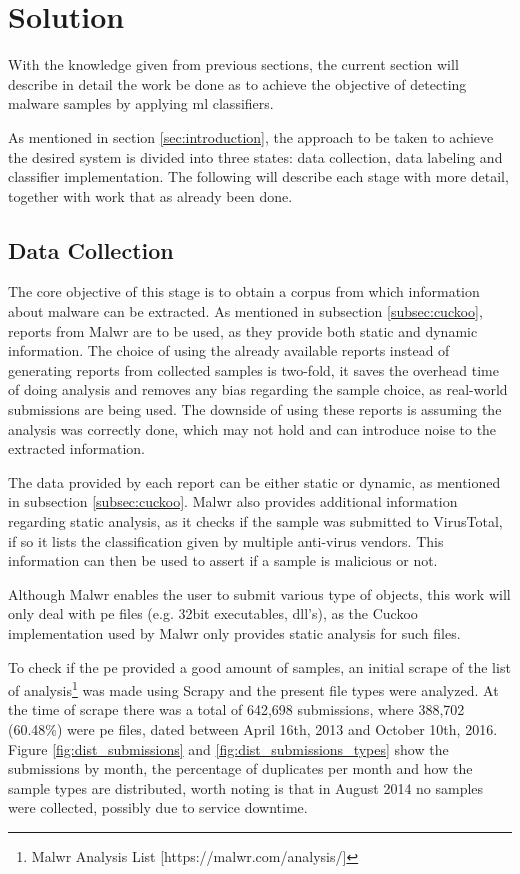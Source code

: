 \documentclass{llncs}
\begin{document}
\section{Solution}\label{sec:solution}

With the knowledge given from previous sections, the current section will describe in detail the work be done as to achieve the objective of detecting malware samples by applying \gls{ml} classifiers.

As mentioned in section \ref{sec:introduction}, the approach to be taken to achieve the desired system is divided into three states: data collection, data labeling and classifier implementation. The following will describe each stage with more detail, together with work that as already been done.

\subsection{Data Collection}\label{subsec:data_collection}

The core objective of this stage is to obtain a corpus from which information about malware can be extracted. As mentioned in subsection \ref{subsec:cuckoo}, reports from Malwr are to be used, as they provide both static and dynamic information. The choice of using the already available reports instead of generating reports from collected samples is two-fold, it saves the overhead time of doing analysis and removes any bias regarding the sample choice, as real-world submissions are being used. The downside of using these reports is assuming the analysis was correctly done, which may not hold and can introduce noise to the extracted information.

The data provided by each report can be either static or dynamic, as mentioned in subsection \ref{subsec:cuckoo}. Malwr also provides additional information regarding static analysis, as it checks if the sample was submitted to VirusTotal, if so it lists the classification given by multiple anti-virus vendors. This information can then be used to assert if a sample is malicious or not.

Although Malwr enables the user to submit various type of objects, this work will only deal with \gls{pe} files (e.g. 32bit executables, \gls{dll}'s), as the Cuckoo implementation used by Malwr only provides static analysis for such files.

To check if the \gls{pe} provided a good amount of samples, an initial scrape of the list of analysis\footnote{Malwr Analysis List [https://malwr.com/analysis/]} was made using Scrapy\cite{tool:scrapy} and the present file types were analyzed. At the time of scrape there was a total of 642,698 submissions, where 388,702 (60.48\%) were \gls{pe} files, dated between April 16th, 2013 and October 10th, 2016. Figure \ref{fig:dist_submissions} and \ref{fig:dist_submissions_types} show the submissions by month, the percentage of duplicates per month and how the sample types are distributed, worth noting is that in August 2014 no samples were collected, possibly due to service downtime.
\end{document}
